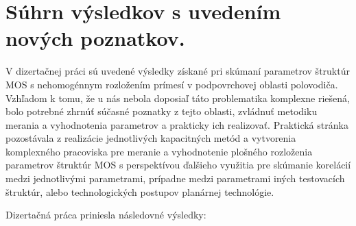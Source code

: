 \chapter{Súhrn výsledkov s uvedením nových poznatkov.}\label{Chapter8}

V dizertačnej práci sú uvedené výsledky získané pri skúmaní parametrov
štruktúr MOS s nehomogénnym rozložením prímesí v podpovrchovej oblasti
polovodiča. Vzhľadom k tomu, že u nás nebola doposiaľ táto
problematika komplexne riešená, bolo potrebné zhrnúť súčasné poznatky
z tejto oblasti, zvládnuť metodiku merania a vyhodnotenia parametrov a
prakticky ich realizovať. Praktická stránka pozostávala z realizácie
jednotlivých kapacitných metód a vytvorenia komplexného pracoviska pre
meranie a vyhodnotenie plošného rozloženia parametrov štruktúr MOS s
perspektívou ďalšieho využitia pre skúmanie korelácií medzi
jednotlivými parametrami, prípadne medzi parametrami iných testovacích
štruktúr, alebo technologických postupov planárnej technológie.

Dizertačná práca priniesla následovné výsledky:

